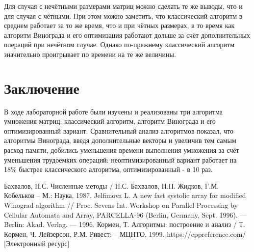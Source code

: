 \documentclass[12pt, a4paper]{report}
\begin{document}
 	Для случая с нечётными размерами матриц можно сделать те же выводы, что и для случая с чётными. При этом можно заметить, что классический алгоритм в среднем работает за то же время, что и при чётных размерах, в то время как алгоритм Винограда и его оптимизация работают дольше за счёт дополнительных операций при нечётном случае. Однако по-прежнему классический алгоритм значительно проигрывает по времени на те же величины.

	\chapter*{Заключение}
	В ходе лабораторной работе были изучены и реализованы три алгоритма умножения матриц: классический алгоритм, алгоритм Винограда и его оптимизированный вариант. Сравнительный анализ алгоритмов показал, что алгоритмы Винограда, введя дополнительные векторы и увеличив тем самым расход памяти, добились уменьшения времени выполнения умножения за счёт уменьшения трудоёмких операций: неоптимизированный вариант работает на 18\% быстрее классического алгоритма, оптимизированный - в 10 раз.
	
	\newpage
	
	\begin{thebibliography}{}
	 Бахвалов, Н.С. Численные методы / Н.С. Бахвалов, Н.П. Жидков, Г.М. Кобельков – М.: Наука, 1987.
	 Jelfimova L. A new fast systolic array for modified Winograd algorithm // Proc. Sevens Int. Workshop on Parallel Processing by Cellular Automata and Array, PARCELLA-96 (Berlin, Germany, Sept. 1996). — Berlin: Akad. Verlag. — 1996.
	 Кормен, Т. Алгоритмы: построение и анализ / Т. Кормен, Ч. Лейзерсон, Р.М. Ривест: – МЦНТО, 1999.
	 https://cppreference.com/ [Электронный ресурс]
	\end{thebibliography}
\end{document}
